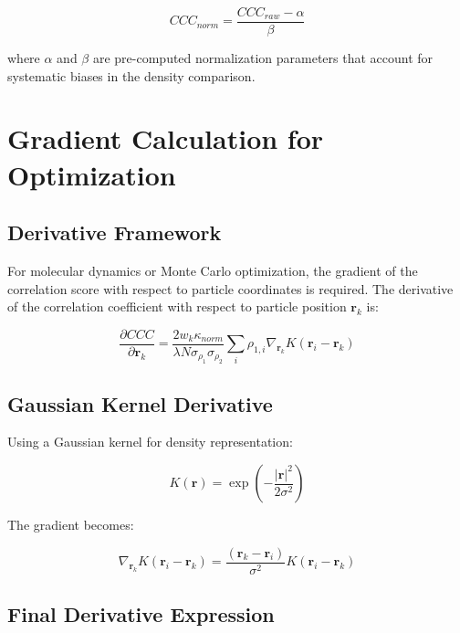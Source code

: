\documentclass[12pt,a4paper]{article}
\begin{document}
\begin{equation}
CCC_{norm} = \frac{CCC_{raw} - \alpha}{\beta}
\end{equation}

where $\alpha$ and $\beta$ are pre-computed normalization parameters 
that account for systematic biases in the density comparison.

\section{Gradient Calculation for Optimization}

\subsection{Derivative Framework}

For molecular dynamics or Monte Carlo optimization, the gradient of 
the correlation score with respect to particle coordinates is required. 
The derivative of the correlation coefficient with respect to particle 
position $\mathbf{r}_k$ is:

\begin{equation}
\frac{\partial CCC}{\partial \mathbf{r}_k} = \frac{2 w_k \kappa_{norm}}{\lambda N \sigma_{\rho_1} \sigma_{\rho_2}} \sum_{i} \rho_{1,i} \nabla_{\mathbf{r}_k} K(\mathbf{r}_i - \mathbf{r}_k)
\end{equation}

\subsection{Gaussian Kernel Derivative}

Using a Gaussian kernel for density representation:

\begin{equation}
K(\mathbf{r}) = \exp\left(-\frac{|\mathbf{r}|^2}{2\sigma^2}\right)
\end{equation}

The gradient becomes:

\begin{equation}
\nabla_{\mathbf{r}_k} K(\mathbf{r}_i - \mathbf{r}_k) = \frac{(\mathbf{r}_k - \mathbf{r}_i)}{\sigma^2} K(\mathbf{r}_i - \mathbf{r}_k)
\end{equation}

\subsection{Final Derivative Expression}
\end{document}
